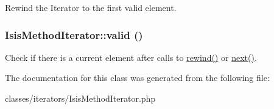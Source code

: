 \label{classIsisMethodIterator_a1a0ee1617a50e6aa57fe80cd0c2023df}
Rewind the Iterator to the first valid element. \hypertarget{classIsisMethodIterator_acb2ac4c3a336d9c6c25d97bd47f60759}{
\subsubsection[{valid}]{\setlength{\rightskip}{0pt plus 5cm}IsisMethodIterator::valid ()}}
\label{classIsisMethodIterator_acb2ac4c3a336d9c6c25d97bd47f60759}
Check if there is a current element after calls to \hyperlink{classIsisMethodIterator_a1a0ee1617a50e6aa57fe80cd0c2023df}{rewind()} or \hyperlink{classIsisMethodIterator_a8a02e17d6597ba1f199bd82ab9fc1b32}{next()}. 

The documentation for this class was generated from the following file:\begin{DoxyCompactItemize}
\item 
classes/iterators/IsisMethodIterator.php\end{DoxyCompactItemize}
